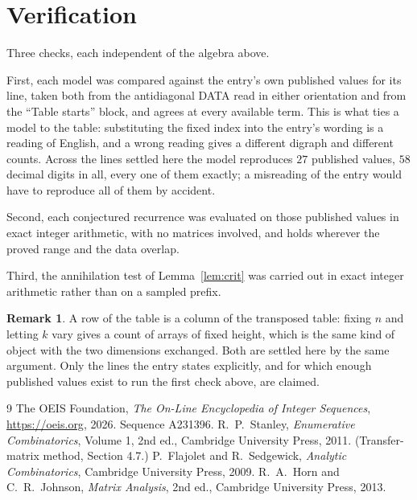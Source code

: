 \documentclass[11pt,a4paper]{article}
\theoremstyle{plain}
\theoremstyle{definition}
\newtheorem{remark}[theorem]{Remark}
\begin{document}
\section{Verification}

Three checks, each independent of the algebra above.

First, each model was compared against the entry's own published values for its line, taken
both from the antidiagonal DATA read in either orientation and from the ``Table starts''
block, and agrees at every available term. This is what ties a model to the table:
substituting the fixed index into the entry's wording is a reading of English, and a wrong
reading gives a different digraph and different counts. Across the lines settled here the
model reproduces $27$ published values, $58$ decimal digits in all, every one of
them exactly; a misreading of the entry would have to reproduce all of them by accident.

Second, each conjectured recurrence was evaluated on those published values in exact
integer arithmetic, with no matrices involved, and holds wherever the proved range and the
data overlap.

Third, the annihilation test of Lemma~\ref{lem:crit} was carried out in exact integer
arithmetic rather than on a sampled prefix.

\begin{remark}
A row of the table is a column of the transposed table: fixing $n$ and letting $k$ vary gives a
count of arrays of fixed height, which is the same kind of object with the two dimensions
exchanged. Both are settled here by the same argument. Only the lines the entry states
explicitly, and for which enough published values exist to run the first check above, are
claimed.
\end{remark}

\begin{thebibliography}{9}
 The OEIS Foundation, \emph{The On-Line Encyclopedia of Integer
Sequences}, \url{https://oeis.org}, 2026. Sequence A231396.
 R.~P.~Stanley, \emph{Enumerative Combinatorics}, Volume 1, 2nd ed.,
Cambridge University Press, 2011. (Transfer-matrix method, Section 4.7.)
 P.~Flajolet and R.~Sedgewick, \emph{Analytic Combinatorics}, Cambridge
University Press, 2009.
 R.~A.~Horn and C.~R.~Johnson, \emph{Matrix Analysis}, 2nd ed., Cambridge
University Press, 2013.
\end{thebibliography}
\end{document}
